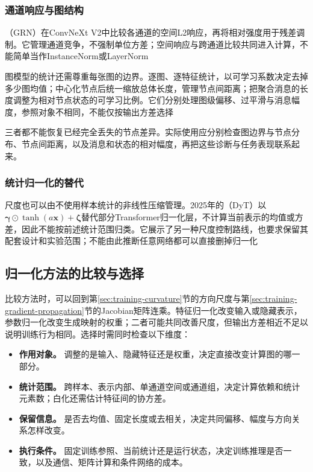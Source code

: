 \subsubsection{通道响应与图结构}
\label{sec:training-grn-qknorm}
\label{sec:training-graph-temporal-norm}
\label{sec:training-global-response-normalization}
（GRN）在ConvNeXt V2中比较各通道的空间L2响应，再将相对强度用于残差调制。它管理通道竞争，不强制单位方差；空间响应与跨通道比较共同进入计算，不能简单当作InstanceNorm或LayerNorm

图模型的统计还需尊重每张图的边界。逐图、逐特征统计，以可学习系数决定去掉多少图均值；中心化节点后统一缩放总体长度，管理节点间距离；把聚合消息的长度调整为相对节点状态的可学习比例。它们分别处理图级偏移、过平滑与消息幅度，参照对象不相同，不能仅按输出方差选择

三者都不能恢复已经完全丢失的节点差异。实际使用应分别检查图边界与节点分布、节点间距离，以及消息和状态的相对幅度，再把这些诊断与任务表现联系起来。

\subsubsection{统计归一化的替代}
\label{sec:training-normalization-substitutes}
尺度也可以由不使用样本统计的非线性压缩管理。2025年的（DyT）以$\bm\gamma\odot\tanh(a\bm x)+\bm\zeta$替代部分Transformer归一化层，不计算当前表示的均值或方差，因此不能按前述统计范围归类。它展示了另一种尺度控制路线，也要求保留其配套设计和实验范围；不能由此推断任意网络都可以直接删掉归一化

\subsection{归一化方法的比较与选择}
\label{sec:training-normalization-comparison}
比较方法时，可以回到第\ref{sec:training-curvature}节的方向尺度与第\ref{sec:training-gradient-propagation}节的Jacobian矩阵连乘。特征归一化改变输入或隐藏表示，参数归一化改变生成映射的权重；二者可能共同改善尺度，但输出方差相近不足以说明训练行为相同。选择时需同时检查以下维度：
\begin{itemize}
  \item \textbf{作用对象。} 调整的是输入、隐藏特征还是权重，决定直接改变计算图的哪一部分。
  \item \textbf{统计范围。} 跨样本、表示内部、单通道空间或通道组，决定计算依赖和统计元素数；白化还需估计特征间的协方差。
  \item \textbf{保留信息。} 是否去均值、固定长度或去相关，决定共同偏移、幅度与方向关系怎样改变。
  \item \textbf{执行条件。} 固定训练参照、当前统计还是运行状态，决定训练推理是否一致，以及通信、矩阵计算和条件网络的成本。
\end{itemize}

